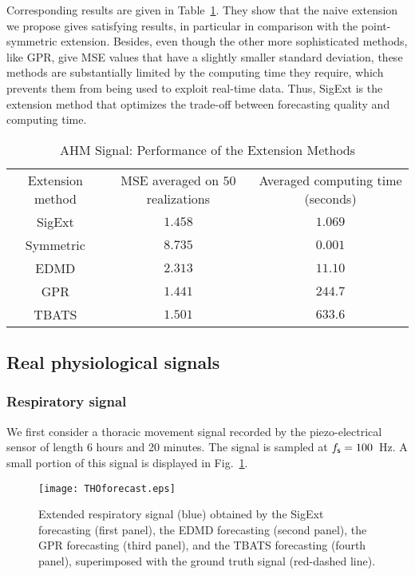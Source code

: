 Corresponding results are given in Table~\ref{tab:mse.sine}. They show that the naive extension we propose gives satisfying results, in particular in comparison with the point-symmetric extension. Besides, even though the other more sophisticated methods, like GPR, give MSE values that have a slightly smaller standard deviation, these methods are substantially limited by the computing time they require, which prevents them from being used to exploit real-time data. Thus, {\sf SigExt} is the extension method that optimizes the trade-off between forecasting quality and computing time.

\begin{table}
\centering
\caption{AHM Signal: Performance of the Extension Methods}
\begin{tabular}{|c||c|c|}
  \hline
   \multirow{2}{40pt}{\centering Extension method} & \multirow{2}{70pt}{\centering MSE averaged on $50$ realizations}  & \multirow{2}{80pt}{\centering Averaged computing time (seconds)} \\
    &  & \\
   \hhline{|=#=|=|}
   {\sf SigExt} & $1.458$ & $1.069$ \\
   \hline
   Symmetric & $8.735$ & $0.001$ \\
   \hline
   EDMD & $2.313$ &$11.10$\\
   \hline
   GPR & $1.441$ &$244.7$ \\
   \hline
   TBATS & $1.501$ & $633.6$ \\
   \hline
\end{tabular}
\label{tab:mse.sine}
\end{table} 


\subsection{Real physiological signals}


\subsubsection{Respiratory signal}
We first consider a thoracic movement signal recorded by the piezo-electrical sensor of length 6 hours and 20 minutes. The signal is sampled at $f_{\mathsf s}=100$~Hz. A small portion of this signal is displayed in Fig.~\ref{fig:tho}.

\begin{figure}
\texttt{[image: THOforecast.eps]}
\caption{Extended respiratory signal (blue) obtained by the {\sf SigExt} forecasting (first panel), the EDMD forecasting (second panel), the GPR forecasting (third panel), and the TBATS forecasting (fourth panel), superimposed with the ground truth signal (red-dashed line).}
\label{fig:tho}
\end{figure}

